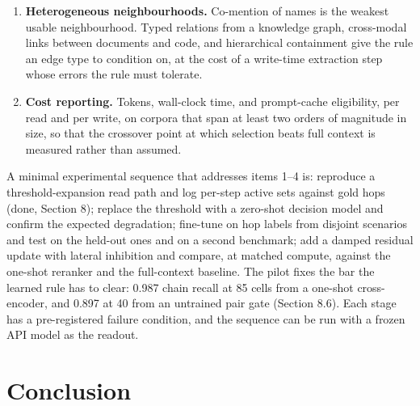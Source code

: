 \documentclass[11pt]{article}
\begin{document}
\begin{enumerate}
\item \textbf{Heterogeneous neighbourhoods.} Co-mention of names is the weakest usable neighbourhood. Typed relations from a knowledge graph, cross-modal links between documents and code, and hierarchical containment give the rule an edge type to condition on, at the cost of a write-time extraction step whose errors the rule must tolerate.
\item \textbf{Cost reporting.} Tokens, wall-clock time, and prompt-cache eligibility, per read and per write, on corpora that span at least two orders of magnitude in size, so that the crossover point at which selection beats full context is measured rather than assumed.
\end{enumerate}

A minimal experimental sequence that addresses items 1--4 is: reproduce a threshold-expansion read path and log per-step active sets against gold hops (done, Section 8); replace the threshold with a zero-shot decision model and confirm the expected degradation; fine-tune on hop labels from disjoint scenarios and test on the held-out ones and on a second benchmark; add a damped residual update with lateral inhibition and compare, at matched compute, against the one-shot reranker and the full-context baseline. The pilot fixes the bar the learned rule has to clear: 0.987 chain recall at 85 cells from a one-shot cross-encoder, and 0.897 at 40 from an untrained pair gate (Section 8.6). Each stage has a pre-registered failure condition, and the sequence can be run with a frozen API model as the readout.

\section{Conclusion}
\end{document}
